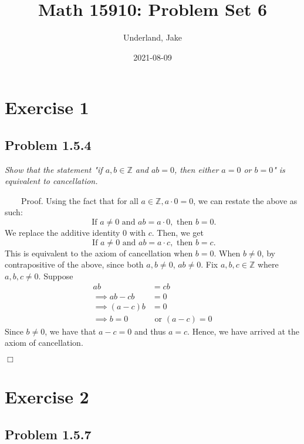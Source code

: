 \documentclass[
]{article}
\title{Math 15910: Problem Set 6}
\author{Underland, Jake}
\date{2021-08-09}
\begin{document}
\maketitle

{
\setcounter{tocdepth}{2}
\tableofcontents
}
\hypertarget{exercise-1}{%
\section{Exercise 1}\label{exercise-1}}

\hypertarget{problem-1.5.4}{%
\subsection{Problem 1.5.4}\label{problem-1.5.4}}

\textit{Show that the statement "if $a,b \in \mathbb{Z}$ and $ab = 0$, then either $a = 0$ or $b=0$" is equivalent to cancellation. }

~~~~Proof. Using the fact that for all
\(a \in \mathbb{Z}, a \cdot 0 = 0\), we can restate the above as such:
\[ \text{ If } a \neq 0 \text{ and } ab = a \cdot 0, \text{ then } b = 0.\]
We replace the additive identity \(0\) with \(c\). Then, we get
\[ \text{ If } a \neq 0 \text{ and } ab = a \cdot c, \text{ then } b = c.\]
This is equivalent to the axiom of cancellation when \(b = 0\). When
\(b \neq 0\), by contrapositive of the above, since both
\(a, b \neq 0\), \(ab \neq 0\). Fix \(a, b, c \in \mathbb{Z}\) where
\(a, b, c \neq 0\). Suppose
\[\begin{aligned} ab &= cb \\ \implies ab - cb &= 0 \\ \implies (a - c)b &= 0 \\ \implies b = 0 &\text{ or } (a - c) = 0 \end{aligned}\]
Since \(b \neq 0\), we have that \(a - c = 0\) and thus \(a = c\).
Hence, we have arrived at the axiom of cancellation.

\hfill \(\Box\)

\hypertarget{exercise-2}{%
\section{Exercise 2}\label{exercise-2}}

\hypertarget{problem-1.5.7}{%
\subsection{Problem 1.5.7}\label{problem-1.5.7}}
\end{document}
